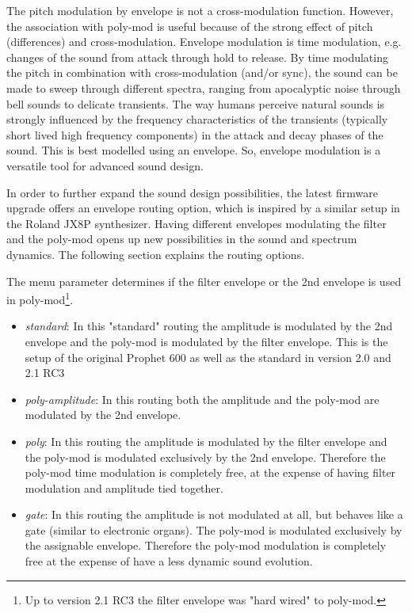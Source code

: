 The pitch modulation by envelope is not a cross-modulation function. However, the association with poly-mod is useful because of the strong effect of pitch (differences) and cross-modulation. Envelope modulation is time modulation, e.g. changes of the sound from attack through hold to release. By time modulating the pitch in combination with cross-modulation (and/or sync), the sound can be made to sweep through different spectra, ranging from apocalyptic noise through bell sounds to delicate transients. The way humans perceive natural sounds is strongly influenced by the frequency characteristics of the transients (typically short lived high frequency components) in the attack and decay phases of the sound. This is best modelled using an envelope. So, envelope modulation is a versatile tool for advanced sound design. 

In order to further expand the sound design possibilities, the latest firmware upgrade offers an envelope routing option, which is inspired by a similar setup in the Roland JX8P synthesizer. Having different envelopes modulating the filter and the poly-mod opens up new possibilities in the sound and spectrum dynamics. The following section explains the routing options. 

The menu parameter \envrouting determines if the filter envelope or the 2nd envelope is used in poly-mod\footnote{Up to version 2.1 RC3 the filter envelope was "hard wired" to poly-mod.}.

\begin{itemize}
  \setlength\itemsep{0cm}
  \item \textit{standard}: In this "standard" routing the amplitude is modulated by the 2nd envelope and the poly-mod is modulated by the filter envelope. This is the setup of the original Prophet 600 as well as the standard in version 2.0 and 2.1 RC3
  \item \textit{poly-amplitude}: In this routing both the amplitude and the poly-mod are modulated by the 2nd envelope. 
  \item \textit{poly}: In this routing the amplitude is modulated by the filter envelope and the poly-mod is modulated exclusively by the 2nd envelope. Therefore the poly-mod time modulation is completely free, at the expense of having filter modulation and amplitude tied together.
  \item \textit{gate}: In this routing the amplitude is not modulated at all, but behaves like a gate (similar to electronic organs). The poly-mod is modulated exclusively by the assignable envelope. Therefore the poly-mod modulation is completely free at the expense of have a less dynamic sound evolution.
\end{itemize}  

